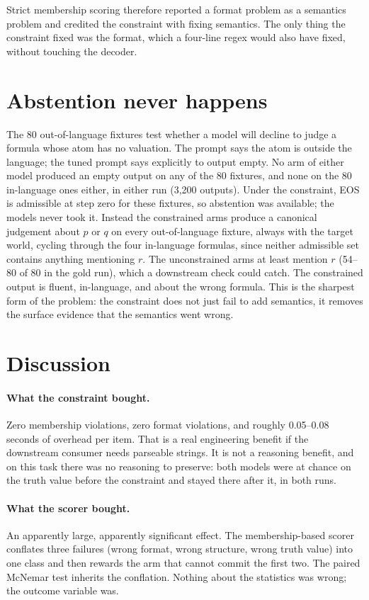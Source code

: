 \documentclass[11pt]{article}
\begin{document}
Strict membership scoring therefore reported a format problem as a semantics problem and credited the constraint with fixing semantics. The only thing the constraint fixed was the format, which a four-line regex would also have fixed, without touching the decoder.

\section{Abstention never happens}
\label{sec:abstain}

The 80 out-of-language fixtures test whether a model will decline to judge a formula whose atom has no valuation. The prompt says the atom is outside the language; the tuned prompt says explicitly to output empty. No arm of either model produced an empty output on any of the 80 fixtures, and none on the 80 in-language ones either, in either run (3,200 outputs). Under the constraint, EOS is admissible at step zero for these fixtures, so abstention was available; the models never took it. Instead the constrained arms produce a canonical judgement about $p$ or $q$ on every out-of-language fixture, always with the target world, cycling through the four in-language formulas, since neither admissible set contains anything mentioning $r$. The unconstrained arms at least mention $r$ (54--80 of 80 in the gold run), which a downstream check could catch. The constrained output is fluent, in-language, and about the wrong formula. This is the sharpest form of the problem: the constraint does not just fail to add semantics, it removes the surface evidence that the semantics went wrong.

\section{Discussion}
\label{sec:discussion}

\paragraph{What the constraint bought.} Zero membership violations, zero format violations, and roughly 0.05--0.08 seconds of overhead per item. That is a real engineering benefit if the downstream consumer needs parseable strings. It is not a reasoning benefit, and on this task there was no reasoning to preserve: both models were at chance on the truth value before the constraint and stayed there after it, in both runs.

\paragraph{What the scorer bought.} An apparently large, apparently significant effect. The membership-based scorer conflates three failures (wrong format, wrong structure, wrong truth value) into one class and then rewards the arm that cannot commit the first two. The paired McNemar test inherits the conflation. Nothing about the statistics was wrong; the outcome variable was.
\end{document}
